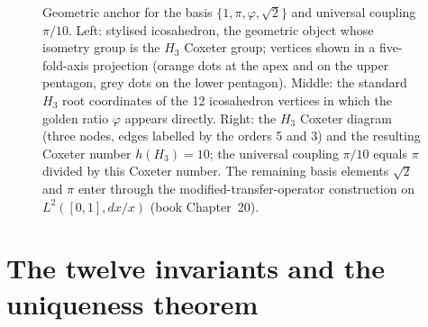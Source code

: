 \documentclass[11pt,a4paper]{amsart}
\theoremstyle{plain}
\theoremstyle{definition}
\begin{document}
\begin{figure}[h]
\caption{Geometric anchor for the basis $\{1,\pi,\varphi,\sqrt{2}\}$ and universal coupling $\pi/10$. Left: stylised icosahedron, the geometric object whose isometry group is the $H_3$ Coxeter group; vertices shown in a five-fold-axis projection (orange dots at the apex and on the upper pentagon, grey dots on the lower pentagon). Middle: the standard $H_3$ root coordinates of the 12 icosahedron vertices in which the golden ratio $\varphi$ appears directly. Right: the $H_3$ Coxeter diagram (three nodes, edges labelled by the orders 5 and 3) and the resulting Coxeter number $h(H_3) = 10$; the universal coupling $\pi/10$ equals $\pi$ divided by this Coxeter number. The remaining basis elements $\sqrt{2}$ and $\pi$ enter through the modified-transfer-operator construction on $L^2([0,1], dx/x)$ (book Chapter~20).}
\label{fig:h3anchor}
\end{figure}

\section{The twelve invariants and the uniqueness theorem}\label{sec:invariants}
\end{document}
